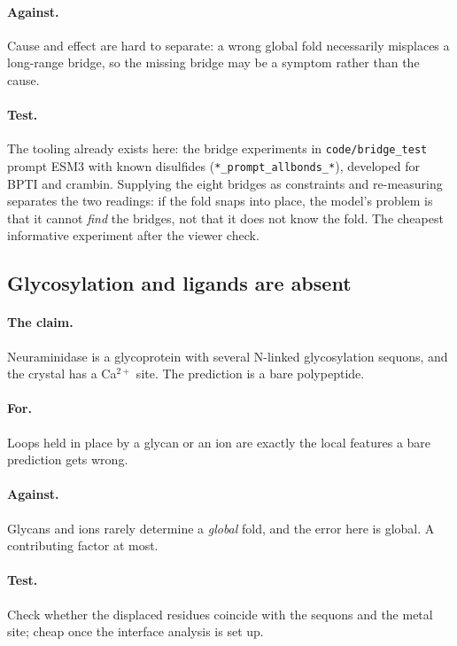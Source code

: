 \documentclass[11pt,a4paper]{article}
\newcommand{\file}[1]{\texttt{#1}}
\begin{document}
\paragraph{Against.} Cause and effect are hard to separate: a wrong global fold
necessarily misplaces a long-range bridge, so the missing bridge may be a symptom
rather than the cause.

\paragraph{Test.} The tooling already exists here: the bridge experiments in
\file{code/bridge\_test} prompt ESM3 with known disulfides
(\file{*\_prompt\_allbonds\_*}), developed for BPTI and crambin. Supplying the
eight bridges as constraints and re-measuring separates the two readings: if the
fold snaps into place, the model's problem is that it cannot \emph{find} the
bridges, not that it does not know the fold. The cheapest informative experiment
after the viewer check.

\subsection{Glycosylation and ligands are absent}

\paragraph{The claim.} Neuraminidase is a glycoprotein with several N-linked
glycosylation sequons, and the crystal has a Ca$^{2+}$ site. The prediction is a
bare polypeptide.

\paragraph{For.} Loops held in place by a glycan or an ion are exactly the local
features a bare prediction gets wrong.

\paragraph{Against.} Glycans and ions rarely determine a \emph{global} fold, and
the error here is global. A contributing factor at most.

\paragraph{Test.} Check whether the displaced residues coincide with the sequons
and the metal site; cheap once the interface analysis is set up.
\end{document}
